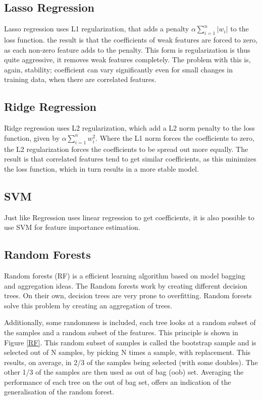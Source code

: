 \clearpage

\subsection{Lasso Regression}
Lasso regression uses L1 regularization, that adds a penalty $\alpha\sum\limits_{i=1}^{n} |w_i|$ to the loss function. the result is that the coefficients of weak features are forced to zero, as each non-zero feature adds to the penalty. This form is regularization is thus quite aggressive, it removes weak features completely. The problem with this is, again, stability; coefficient can vary significantly even for small changes in training data, when there are correlated features.

\subsection{Ridge Regression}
Ridge regression uses L2 regularization, which add a L2 norm penalty to the loss function, given by $\alpha\sum\limits_{i=1}^{n} w_i^2$. Where the L1 norm forces the coefficients to zero, the L2 regularization forces the coefficients to be spread out more equally. The result is that correlated features tend to get similar coefficients, as this minimizes the loss function, which in turn results in a more stable model. 

\subsection{SVM}
Just like Regression uses linear regression to get coefficients, it is also possible to use SVM for feature importance estimation.

\subsection{Random Forests}
Random forests (RF)  is a efficient learning algorithm based on model bagging and aggregation ideas\citep{rfPaper}. The Random forests work by creating different decision trees. On their own, decision trees are very prone to overfitting. Random forests solve this problem by creating an aggregation of trees. 

\npar

Additionally, some randomness is included, each tree looks at a random subset of the samples and a random subset of the features. This principle is shown in Figure \ref{RF}. This random subset of samples is called the bootstrap sample and is selected out of N samples, by picking N times a sample, with replacement. This results, on average, in 2/3 of the samples being selected (with some doubles). The other 1/3 of the samples are then used as out of bag (oob)  set. Averaging the performance of each tree on the out of bag set, offers an indication of the generalisation of the random forest.

